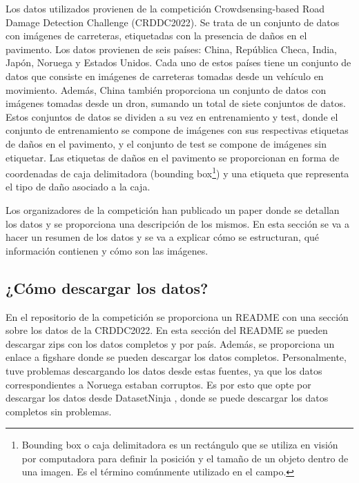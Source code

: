 Los datos utilizados provienen de la competición Crowdsensing-based Road Damage Detection Challenge (CRDDC2022)\cite{CRDDC2022_paper}. Se trata de un conjunto de datos con imágenes de carreteras, etiquetadas con la presencia de daños en el pavimento. Los datos provienen de seis países: China, República Checa, India, Japón, Noruega y Estados Unidos. Cada uno de estos países tiene un conjunto de datos que consiste en imágenes de carreteras tomadas desde un vehículo en movimiento. Además, China también proporciona un conjunto de datos con imágenes tomadas desde un dron, sumando un total de siete conjuntos de datos. Estos conjuntos de datos se dividen a su vez en entrenamiento y test, donde el conjunto de entrenamiento se compone de imágenes con sus respectivas etiquetas de daños en el pavimento, y el conjunto de test se compone de imágenes sin etiquetar. Las etiquetas de daños en el pavimento se proporcionan en forma de coordenadas de caja delimitadora (bounding box\footnote{Bounding box o caja delimitadora es un rectángulo que se utiliza en visión por computadora para definir la posición y el tamaño de un objeto dentro de una imagen. Es el término comúnmente utilizado en el campo.}) y una etiqueta que representa el tipo de daño asociado a la caja. 

Los organizadores de la competición han publicado un paper \cite{RDD2022_data_paper} donde se detallan los datos y se proporciona una descripción de los mismos. En esta sección se va a hacer un resumen de los datos y se va a explicar cómo se estructuran, qué información contienen y cómo son las imágenes.


\subsection{¿Cómo descargar los datos?}
En el repositorio de la competición \cite{RoadDamageDetector_repo} se proporciona un README con una sección sobre los datos de la CRDDC2022. En esta sección del README se pueden descargar zips con los datos completos y por país. Además, se proporciona un enlace a figshare \cite{RDD2022_dataset} donde se pueden descargar los datos completos. Personalmente, tuve problemas descargando los datos desde estas fuentes, ya que los datos correspondientes a Noruega estaban corruptos. Es por esto que opte por descargar los datos desde DatasetNinja \cite{RDD2022_datasetNinja}, donde se puede descargar los datos completos sin problemas.


